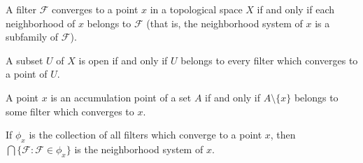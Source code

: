 A filter $\mathcal{F}$ converges to a point $x$ in a topological space $X$ if and only if each neighborhood of $x$ belongs to $\mathcal{F}$ (that is, the neighborhood system of $x$ is a subfamily of $\mathcal{F}$).

A subset $U$ of $X$ is open if and only if $U$ belongs to every filter which converges to a point of $U$.

A point $x$ is an accumulation point of a set $A$ if and only if $A \setminus \{x\}$ belongs to some filter which converges to $x$.

If $\phi_x$ is the collection of all filters which converge to a point $x$, then $\bigcap\{\mathcal{F} : \mathcal{F} \in \phi_x\}$ is the neighborhood system of $x$.
